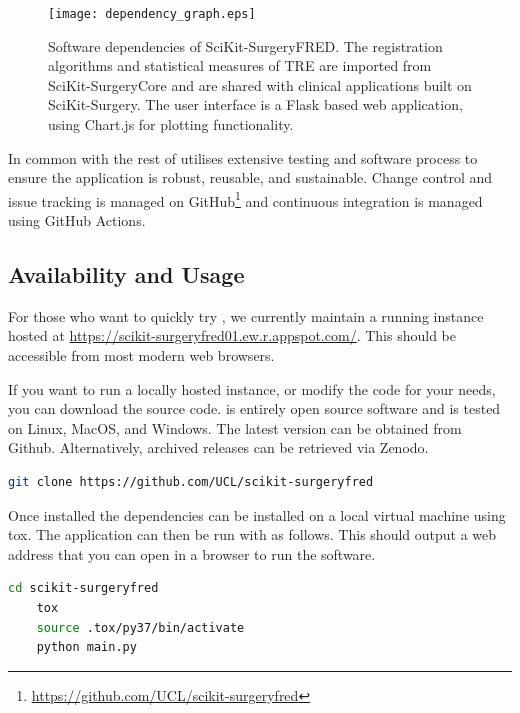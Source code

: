 \begin{figure}
	\begin{center}
	\texttt{[image: dependency\_graph.eps]}
		\caption{\label{fig:dependencies}Software dependencies of SciKit-SurgeryFRED. The registration algorithms and statistical measures of {TRE} are imported from SciKit-SurgeryCore and are shared with clinical applications built on SciKit-Surgery. The user interface is a Flask based web application, using Chart.js for plotting functionality.}
	\end{center}
\end{figure}

In common with the rest of \sksurgery \fred utilises extensive testing and software process \cite{1398621} to 
ensure the application is robust, reusable, and sustainable\cite{VENTERS2018174}. Change control and issue tracking is managed
on GitHub\footnote{\href{https://github.com/UCL/scikit-surgeryfred}{https://github.com/UCL/scikit-surgeryfred}} and continuous integration is managed using
GitHub Actions.

\subsection{Availability and Usage}
For those who want to quickly try \fredns, we currently maintain a running instance hosted at \href{https://scikit-surgeryfred01.ew.r.appspot.com/}{https://scikit-surgeryfred01.ew.r.appspot.com/}. This should be accessible from most modern web browsers.

If you want to run a locally hosted instance, or modify the code for your needs, you can download the source code. \fred is entirely open source software and is tested on Linux, MacOS, and Windows. The latest version can be obtained from Github. Alternatively, archived releases can be retrieved via Zenodo\cite{stephen_thompson_2020_4314971}.

\begin{lstlisting}[language=bash]
	git clone https://github.com/UCL/scikit-surgeryfred
\end{lstlisting}

Once installed the dependencies can be installed on a local virtual machine using tox. The application can then be run with as follows. This should output a web address that you can open in a browser to run the software. 

\begin{lstlisting}[language=bash]
	cd scikit-surgeryfred
	tox
	source .tox/py37/bin/activate
	python main.py
\end{lstlisting}

